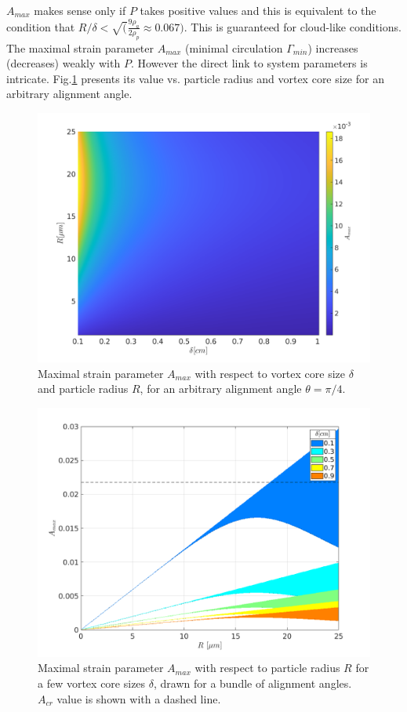 \documentclass[../main.tex]{subfiles}
\begin{document}
\noindent $A_{max}$ makes sense only if $P$ takes positive values and this is equivalent to the condition that $R/\delta<\sqrt(\frac{9 \rho_a}{2 \rho_p}\approx 0.067)$. This is guaranteed for cloud-like conditions. The maximal strain parameter $A_{max}$ (minimal circulation $\Gamma_{min}$) increases (decreases) weakly with $P$. However the direct link to system parameters is intricate. Fig.\ref{fig:ch3_10} presents its value vs. particle radius and vortex core size for an arbitrary alignment angle.

\begin{figure}
\centering
\noindent \includegraphics[width=30pc]{gfx/Amax_vs_delta_vs_R.png}
\caption{Maximal strain parameter $A_{max}$ with respect to vortex core size $\delta$ and particle radius $R$, for an arbitrary alignment angle $\theta=\pi/4$.}
\label{fig:ch3_10}
\end{figure}

\begin{figure}
\centering
\noindent \includegraphics[width=30pc]{gfx/Amax_vs_R.png}
\caption{Maximal strain parameter $A_{max}$ with respect to  particle radius $R$ for a few vortex core sizes $\delta$, drawn for a bundle of alignment angles. $A_{cr}$  value is shown with a dashed line.}
\label{fig:ch3_11}
\end{figure}
\end{document}
